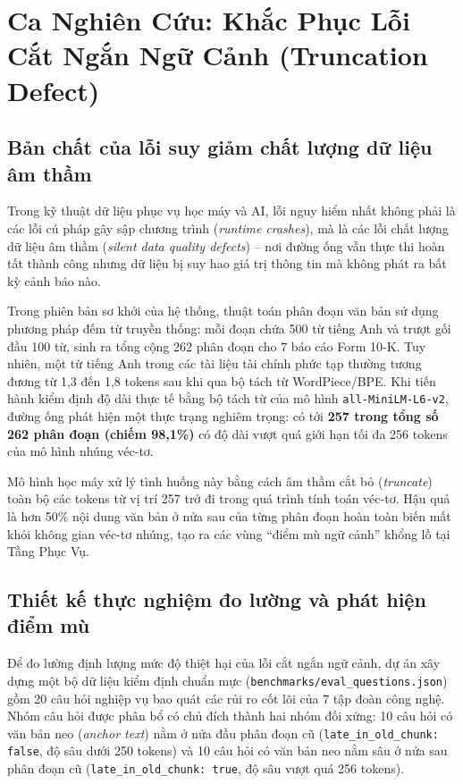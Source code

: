 \section{Ca Nghiên Cứu: Khắc Phục Lỗi Cắt Ngắn Ngữ Cảnh (Truncation Defect)}

\subsection{Bản chất của lỗi suy giảm chất lượng dữ liệu âm thầm}
Trong kỹ thuật dữ liệu phục vụ học máy và AI, lỗi nguy hiểm nhất không phải là các lỗi cú pháp gây sập chương trình (\textit{runtime crashes}), mà là các lỗi chất lượng dữ liệu âm thầm (\textit{silent data quality defects}) -- nơi đường ống vẫn thực thi hoàn tất thành công nhưng dữ liệu bị suy hao giá trị thông tin mà không phát ra bất kỳ cảnh báo nào.

Trong phiên bản sơ khởi của hệ thống, thuật toán phân đoạn văn bản sử dụng phương pháp đếm từ truyền thống: mỗi đoạn chứa 500 từ tiếng Anh và trượt gối đầu 100 từ, sinh ra tổng cộng 262 phân đoạn cho 7 báo cáo Form 10-K. Tuy nhiên, một từ tiếng Anh trong các tài liệu tài chính phức tạp thường tương đương từ 1,3 đến 1,8 tokens sau khi qua bộ tách từ WordPiece/BPE. Khi tiến hành kiểm định độ dài thực tế bằng bộ tách từ của mô hình \texttt{all-MiniLM-L6-v2}, đường ống phát hiện một thực trạng nghiêm trọng: có tới \textbf{257 trong tổng số 262 phân đoạn (chiếm 98,1\%)} có độ dài vượt quá giới hạn tối đa 256 tokens của mô hình nhúng véc-tơ.

Mô hình học máy xử lý tình huống này bằng cách âm thầm cắt bỏ (\textit{truncate}) toàn bộ các tokens từ vị trí 257 trở đi trong quá trình tính toán véc-tơ. Hậu quả là hơn 50\% nội dung văn bản ở nửa sau của từng phân đoạn hoàn toàn biến mất khỏi không gian véc-tơ nhúng, tạo ra các vùng ``điểm mù ngữ cảnh'' khổng lồ tại Tầng Phục Vụ.

\subsection{Thiết kế thực nghiệm đo lường và phát hiện điểm mù}
Để đo lường định lượng mức độ thiệt hại của lỗi cắt ngắn ngữ cảnh, dự án xây dựng một bộ dữ liệu kiểm định chuẩn mực (\texttt{benchmarks/eval\_questions.json}) gồm 20 câu hỏi nghiệp vụ bao quát các rủi ro cốt lõi của 7 tập đoàn công nghệ. Nhóm câu hỏi được phân bổ có chủ đích thành hai nhóm đối xứng: 10 câu hỏi có văn bản neo (\textit{anchor text}) nằm ở nửa đầu phân đoạn cũ (\texttt{late\_in\_old\_chunk: false}, độ sâu dưới 250 tokens) và 10 câu hỏi có văn bản neo nằm sâu ở nửa sau phân đoạn cũ (\texttt{late\_in\_old\_chunk: true}, độ sâu vượt quá 256 tokens).

